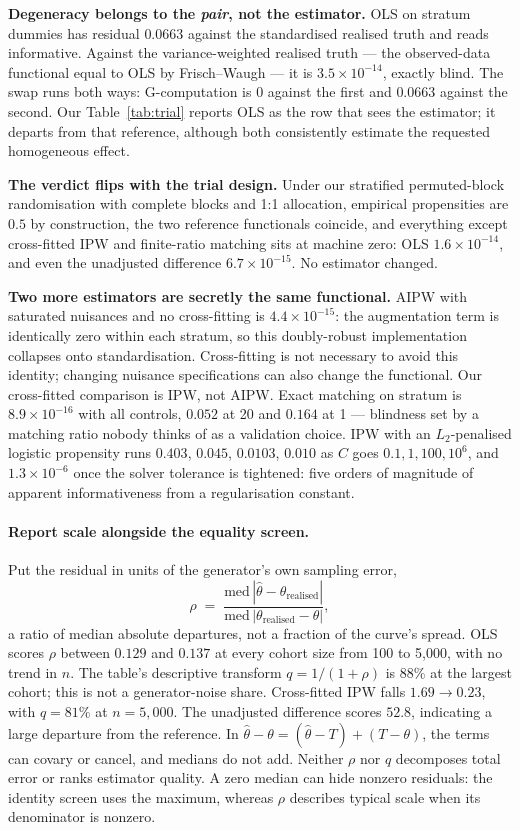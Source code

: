 \textbf{Degeneracy belongs to the \emph{pair}, not the estimator.} OLS on
stratum dummies has residual $0.0663$ against the standardised realised truth
and reads informative. Against the variance-weighted realised truth --- the observed-data functional
equal to OLS by Frisch--Waugh --- it is
$3.5\times10^{-14}$, exactly blind. The swap runs both ways: G-computation is
$0$ against the first and $0.0663$ against the second. Our Table~\ref{tab:trial}
reports OLS as the row that sees the estimator; it departs from that reference, although both consistently estimate the
requested homogeneous effect.

\textbf{The verdict flips with the trial design.} Under our stratified
permuted-block randomisation with complete blocks and 1:1 allocation, empirical
propensities are $0.5$ by construction, the two reference functionals
coincide, and everything except cross-fitted IPW and finite-ratio matching sits
at machine zero: OLS $1.6\times10^{-14}$, and even the unadjusted difference
$6.7\times10^{-15}$. No estimator changed.

\textbf{Two more estimators are secretly the same functional.} AIPW with
saturated nuisances and no cross-fitting is $4.4\times10^{-15}$: the
augmentation term is identically zero within each stratum, so this
doubly-robust implementation collapses onto standardisation. Cross-fitting is
not necessary to avoid this identity; changing nuisance specifications can also
change the functional. Our cross-fitted comparison is IPW, not AIPW. Exact matching on
stratum is $8.9\times10^{-16}$ with all controls, $0.052$ at 20 and $0.164$ at
1 --- blindness set by a matching ratio nobody thinks of as a validation
choice. IPW with an $L_2$-penalised logistic propensity runs $0.403$, $0.045$,
$0.0103$, $0.010$ as $C$ goes $0.1, 1, 100, 10^6$, and $1.3\times10^{-6}$ once
the solver tolerance is tightened: five orders of magnitude of apparent
informativeness from a regularisation constant.

\paragraph{Report scale alongside the equality screen.} Put the residual in units of the
generator's own sampling error,
\[
\rho \;=\; \frac{\mathrm{med}\,|\hat\theta - \theta_{\text{realised}}|}
                {\mathrm{med}\,|\theta_{\text{realised}} - \theta|},
\]
a ratio of median absolute departures, not a fraction of the curve's spread.
OLS scores $\rho$ between $0.129$ and $0.137$ at every cohort size from
100 to 5{,}000, with no trend in $n$. The table's descriptive transform
$q=1/(1+\rho)$ is $88\%$ at the largest cohort; this is not a generator-noise
share. Cross-fitted IPW falls $1.69 \rightarrow 0.23$, with $q=81\%$ at
$n = 5{,}000$. The unadjusted difference scores $52.8$, indicating a large
departure from the reference. In
$\hat\theta-\theta=(\hat\theta-T)+(T-\theta)$, the terms can covary or cancel,
and medians do not add. Neither $\rho$ nor $q$ decomposes total error or ranks
estimator quality. A zero median can hide nonzero residuals: the identity screen
uses the maximum, whereas $\rho$ describes typical scale when its denominator
is nonzero.
\fi

